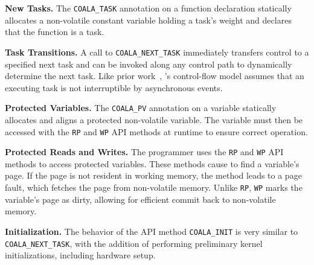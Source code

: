 
\textbf{New Tasks.} The \texttt{COALA\_TASK} annotation on a function
declaration statically allocates a non-volatile constant variable holding a
task's weight and declares that the function is a task.

\textbf{Task Transitions.} A call to \texttt{COALA\_NEXT\_TASK} immediately
transfers control to a specified next task and can be invoked along
any control path to dynamically determine the next task.
Like prior work~\cite{chain,dino,ratchet}, \sys's control-flow model
assumes that an executing task is not interruptible by asynchronous events.  

\textbf{Protected Variables.} The \texttt{COALA\_PV} annotation on a
variable statically allocates and aligns a protected non-volatile variable. The
variable must then be accessed with the \texttt{RP} and \texttt{WP} API methods at
runtime to ensure correct operation.

\textbf{Protected Reads and Writes.} The programmer uses the \texttt{RP} and \texttt{WP} API
methods to access protected variables.  These methods cause \sys to find a variable's page.
If the page is not resident in working memory, the method leads to a page fault,
which fetches the page from non-volatile memory. Unlike \texttt{RP},
\texttt{WP} marks the variable's page as dirty, allowing for efficient 
commit back to non-volatile memory. 

\textbf{Initialization.} The behavior of the API method
\texttt{COALA\_INIT} is very similar to \texttt{COALA\_NEXT\_TASK}, with the
addition of performing preliminary kernel initializations, including hardware setup.



